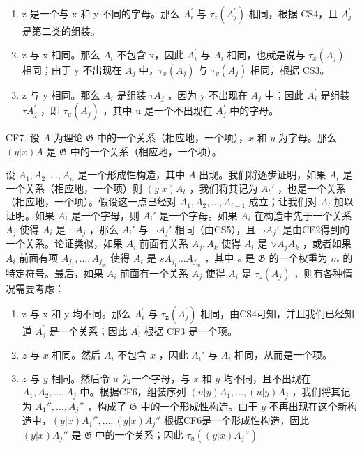 \begin{enumerate}
\def\labelenumi{(\alph{enumi})}
\item
  z 是一个与 x 和 y 不同的字母。那么 \(A_{i}^{\prime}\) 与 \(\tau_{z}(A_{j}^{\prime})\) 相同，根据 CS4，且 \(A_{j}^{\prime}\) 是第二类的组装。
\item
  z 与 x 相同。那么 \(A_{i}\) 不包含 x，因此 \(A_{i}^{\prime}\) 与 \(A_{i}\) 相同，也就是说与 \(\tau_{x}(A_{j})\) 相同；由于 y 不出现在 \(A_{j}\) 中，\(\tau_{x}(A_{j})\) 与 \(\tau_{y}(A_{j})\) 相同，根据 CS3。
\item
  z 与 y 相同。那么 \(A_{i}\) 是组装 \(\tau A_{j}\) ，因为 y 不出现在 \(A_{j}\) 中；因此 \(A_{i}^{\prime}\) 是组装 \(\tau A_{j}^{\prime}\) ，即 \(\tau_{u}(A_{j}^{\prime})\) ，其中 u 是一个不出现在 \(A_{j}^{\prime}\) 中的字母。
\end{enumerate}

CF7. 设 \(A\) 为理论 \(\mathfrak{G}\) 中的一个关系（相应地，一个项），\(x\) 和 \(y\) 为字母。那么 \((y|x)A\) 是 \(\mathfrak{G}\) 中的一个关系（相应地，一个项）。

设 \(A_1, A_2, \ldots, A_n\) 是一个形成性构造，其中 \(A\) 出现。我们将逐步证明，如果 \(A_t\) 是一个关系（相应地，一个项）则 \((y|x)A_t\) ，我们将其记为 \(A_t'\) ，也是一个关系（相应地，一个项）。假设这一点已经对 \(A_1, A_2, \ldots, A_{i-1}\) 成立；让我们对 \(A_i\) 加以证明。如果 \(A_i\) 是一个字母，则 \(A_i'\) 是一个字母。如果 \(A_i\) 在构造中先于一个关系 \(A_j\) 使得 \(A_i\) 是 \(\neg A_j\) ，那么 \(A_i'\) 与 \(\neg A_j'\) 相同（由CS5），且 \(\neg A_j'\) 是由CF2得到的一个关系。论证类似，如果 \(A_i\) 前面有关系 \(A_j, A_k\) 使得 \(A_i\) 是 \(\vee A_jA_k\) ，或者如果 \(A_i\) 前面有项 \(A_{j_1}, \ldots, A_{j_m}\) 使得 \(A_i\) 是 \(sA_{j_1}\ldots A_{j_m}\) ，其中 \(s\) 是 \(\mathfrak{G}\) 的一个权重为 \(m\) 的特定符号。最后，如果 \(A_i\) 前面有一个关系 \(A_j\) 使得 \(A_i\) 是 \(\tau_z(A_j)\) ，则有各种情况需要考虑：

\begin{enumerate}
\def\labelenumi{(\alph{enumi})}
\item
  z 与 x 和 y 均不同。那么 \(A_{i}^{\prime}\) 与 \(\tau_{\mathbf{z}}(A_{j}^{\prime})\) 相同，由CS4可知，并且我们已经知道 \(A_{j}^{\prime}\) 是一个关系；因此 \(A_{i}^{\prime}\) 根据 CF3 是一个项。
\item
  \(z\) 与 \(x\) 相同。然后 \(A_i\) 不包含 \(x\) ，因此 \(A_i'\) 与 \(A_i\) 相同，从而是一个项。
\item
  \(z\) 与 \(y\) 相同。然后令 \(u\) 为一个字母，与 \(x\) 和 \(y\) 均不同，且不出现在 \(A_1, A_2, \ldots, A_j\) 中。根据CF6，组装序列 \((u|y) A_1, \ldots, (u|y) A_j\) ，我们将其记为 \(A_1'', \ldots, A_j''\) ，构成了 \(\mathfrak{G}\) 中的一个形成性构造。由于 \(y\) 不再出现在这个新构造中，\((y|x) A_1'', \ldots, (y|x) A_j''\) 根据CF6是一个形成性构造，因此 \((y|x) A_j''\) 是 \(\mathfrak{G}\) 中的一个关系；因此 \(\tau_u((y|x)A_j'')\)
\end{enumerate}

